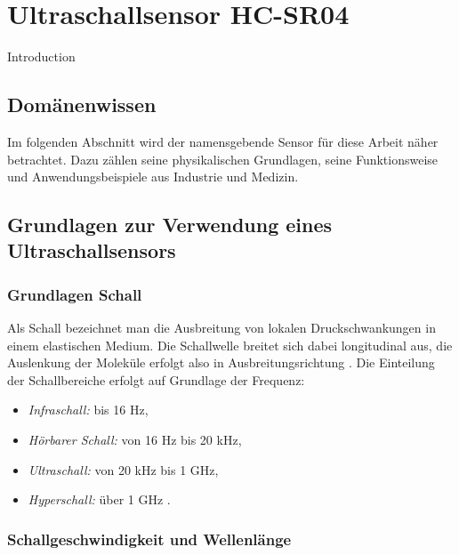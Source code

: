 %
%
%

\chapter{Ultraschallsensor HC-SR04}


Introduction

\section{Domänenwissen}
Im folgenden Abschnitt wird der namensgebende Sensor für diese Arbeit näher betrachtet. Dazu zählen seine physikalischen Grundlagen, seine Funktionsweise und Anwendungsbeispiele aus Industrie und Medizin.

\section{Grundlagen zur Verwendung eines Ultraschallsensors}

\subsection{Grundlagen Schall}

Als Schall bezeichnet man die Ausbreitung von lokalen Druckschwankungen in einem elastischen Medium. Die Schallwelle breitet sich dabei longitudinal aus, die Auslenkung der Moleküle erfolgt also in Ausbreitungsrichtung \cite{Tipler:2024}.
Die Einteilung der Schallbereiche erfolgt auf Grundlage der Frequenz:

\begin{itemize}
    \item \textit{Infraschall:} bis 16 Hz,
    \item \textit{Hörbarer Schall:} von 16 Hz bis 20 kHz,
    \item \textit{Ultraschall:} von 20 kHz bis 1 GHz,
    \item \textit{Hyperschall:} über 1 GHz \cite{Hering:2023}.
\end{itemize}



\subsection{Schallgeschwindigkeit und Wellenlänge}\label{AbschnittVschall}

